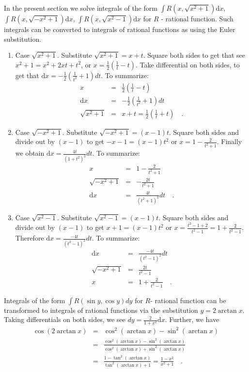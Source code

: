 \documentclass[12pt]{book}
\newcommand{\diff}{\text{d}}
\begin{document}
In the present section we solve integrals of the form $\int R(x, \sqrt{x^2+1})\diff x$, $\int R(x, \sqrt{-x^2+1})\diff x$, $\int R(x, \sqrt{x^2-1})\diff x$ for $R$ - rational function. Such integrals can be converted to integrals of rational functions as using the Euler substitution.

\begin{enumerate}
\item Case $\sqrt{x^2+1}$. Substitute $\sqrt{x^2+1}= x+t $. Square both sides to get that see $x^2+1=x^2+2xt+t^2$, or $x=\frac12\left(\frac{1}{t}- t\right)$. Take differential on both sides, to get that $\diff x=-\frac12(\frac{1}{t^2}+1) dt$. To summarize:
\begin{equation}\label{eqEulerSub1}
\begin{array}{rcl}
x&=&\frac12\left(\frac{1}{t}- t\right)\\
\diff x&=&-\frac12(\frac{1}{t^2}+1) dt\\
\sqrt{x^2+1}&=&x+t= \frac12 \left(\frac1t +t\right) \quad .
\end{array}
\end{equation}
\item Case $\sqrt{-x^2+1}$. Substitute $\sqrt{-x^2+1}=(x-1)t$. Square both sides and divide out by $(x-1)$ to get $-x-1=(x-1)t^2$ or $x=1-\frac{2}{t^2+1}$. Finally we obtain $\diff x=\frac{4t}{(1+t^2)^2}dt$. To summarize:
\[
\begin{array}{rcl}
x&=&1-\frac{2}{t^2+1}\\
\sqrt{-x^2+1}&=&-\frac{2t}{t^2+1}\\
\diff x&=&\frac{4t}{(t^2+1)^2}dt\quad .
\end{array}
\] 
\item Case $\sqrt{x^2-1} $. Substitute $\sqrt{x^2-1}=(x-1)t$. Square both sides and divide out by $(x-1)$ to get $x+1=(x-1)t^2$ or $x=\frac{t^2-1+2}{t^2-1}= 1+\frac{2}{t^2-1}$. Therefore $\diff x=\frac{-4t}{(t^2-1)^2}dt$. To summarize:
\[
\begin{array}{rcl}
\diff x&=&\frac{-4t}{(t^2-1)^2}dt\\
\sqrt{-x^2+1}&=&\frac{2t}{t^2-1} \\
x&=&1+\frac{2}{t^2-1}\quad .
\end{array}
\] 
\end{enumerate}
Integrals of the form $\int R(\sin y,\cos y )dy$ for $R$- rational function can be transformed to integrals of rational functions via the substitution $y= 2\arctan x$. Taking differentials on both sides, we see $dy=\frac{2}{1+x^2}\diff x$. Further, we have 
\[
\begin{array}{rcl}
\cos (2\arctan x) &=&\displaystyle \cos^2(\arctan x)- \sin^2(\arctan x)\\
&=&  \frac{\cos^2(\arctan x)- \sin^2(\arctan x)}{\cos^2(\arctan x)+ \sin^2(\arctan x)}\\
&=& \displaystyle \frac{1- \tan^2(\arctan x)}{\tan^2(\arctan x)+1}= \frac{1- x^2}{x^2+1}\quad .
\end{array}
\]
\end{document}
